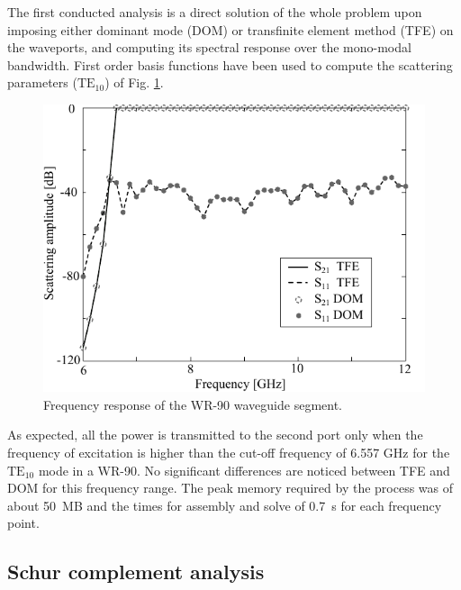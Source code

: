 The first conducted analysis is a direct solution of the whole problem upon imposing either dominant mode (DOM) or transfinite element method (TFE) on the waveports, and computing its spectral response over the mono-modal bandwidth. First order basis functions have been used to compute the scattering parameters ($\mathrm{TE}_{10}$) of Fig. \ref{fig:WRfreq}.

\begin{figure}[h!]
\centering
\includegraphics[width=13.4cm]{WRfreq}
\caption{Frequency response of the WR-90 waveguide segment.}
\label{fig:WRfreq}
\end{figure}

As expected, all the power is transmitted to the second port only when the frequency of excitation is higher than the cut-off frequency of 6.557 GHz for the $\mathrm{TE}_{10}$ mode in a WR-90. No significant differences are noticed between TFE and DOM for this frequency range. The peak memory required by the process was of about 50~MB and the times for assembly and solve of 0.7~s for each frequency point.

\subsection{Schur complement analysis}

